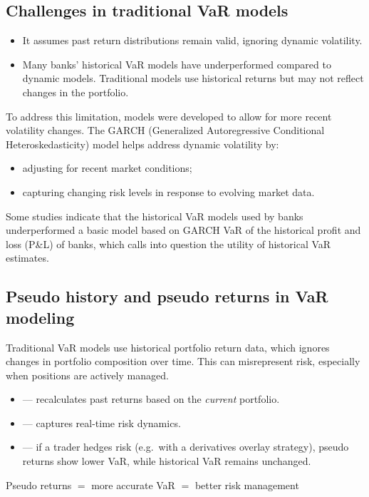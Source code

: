 \subsection{Challenges in traditional VaR models}
\begin{itemize}
\item It assumes past return distributions remain valid, ignoring dynamic volatility.
\item Many banks' historical VaR models have underperformed compared to dynamic models.
      Traditional models use historical returns but may not reflect changes in the portfolio.
\end{itemize}

To address this limitation,  models were developed to allow for more recent
volatility changes. The GARCH (Generalized Autoregressive Conditional Heteroskedasticity) model
helps address dynamic volatility by:
\begin{itemize}
\item adjusting for recent market conditions;
\item capturing changing risk levels in response to evolving market data.
\end{itemize}

Some studies indicate that the historical VaR models used by banks underperformed a basic model
based on GARCH VaR of the historical profit and loss (P\&L) of banks, which calls into question
the utility of historical VaR estimates.

\subsection{Pseudo history and pseudo returns in VaR modeling}
Traditional VaR models use historical portfolio return data, which ignores changes in portfolio
composition over time. This can misrepresent risk, especially when positions are actively
managed.

\begin{mrkeybox}[title={Why use pseudo returns?}]
\begin{itemize}
\item {} --- recalculates past returns based on the
      \textit{current} portfolio.
\item {} --- captures real-time risk dynamics.
\item {} --- if a trader hedges risk (e.g.\ with a derivatives
      overlay strategy), pseudo returns show lower VaR, while historical VaR remains unchanged.
\end{itemize}
\begin{center}
Pseudo returns $=$ more accurate VaR $=$ better risk management
\end{center}
\end{mrkeybox}


